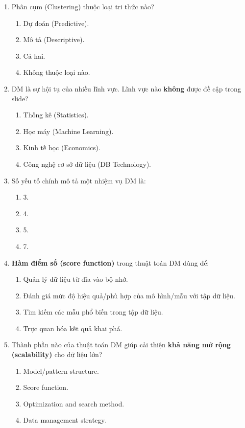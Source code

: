 \documentclass[10pt]{article}
\begin{document}
\begin{enumerate}[leftmargin=*, label=\textbf{Câu \arabic*.}]
    \item Phân cụm (Clustering) thuộc loại tri thức nào?
    \begin{enumerate}[label=\Alph*.]
        \item Dự đoán (Predictive).
        \item Mô tả (Descriptive).
        \item Cả hai.
        \item Không thuộc loại nào.
    \end{enumerate}

    \item DM là sự hội tụ của nhiều lĩnh vực. Lĩnh vực nào \textbf{không} được đề cập trong slide?
    \begin{enumerate}[label=\Alph*.]
        \item Thống kê (Statistics).
        \item Học máy (Machine Learning).
        \item Kinh tế học (Economics).
        \item Công nghệ cơ sở dữ liệu (DB Technology).
    \end{enumerate}

    \item Số yếu tố chính mô tả một nhiệm vụ DM là:
    \begin{enumerate}[label=\Alph*.]
        \item 3.
        \item 4.
        \item 5.
        \item 7.
    \end{enumerate}

    \item \textbf{Hàm điểm số (score function)} trong thuật toán DM dùng để:
    \begin{enumerate}[label=\Alph*.]
        \item Quản lý dữ liệu từ đĩa vào bộ nhớ.
        \item Đánh giá mức độ hiệu quả/phù hợp của mô hình/mẫu với tập dữ liệu.
        \item Tìm kiếm các mẫu phổ biến trong tập dữ liệu.
        \item Trực quan hóa kết quả khai phá.
    \end{enumerate}

    \item Thành phần nào của thuật toán DM giúp cải thiện \textbf{khả năng mở rộng (scalability)} cho dữ liệu lớn?
    \begin{enumerate}[label=\Alph*.]
        \item Model/pattern structure.
        \item Score function.
        \item Optimization and search method.
        \item Data management strategy.
    \end{enumerate}


\end{enumerate}
\end{document}
